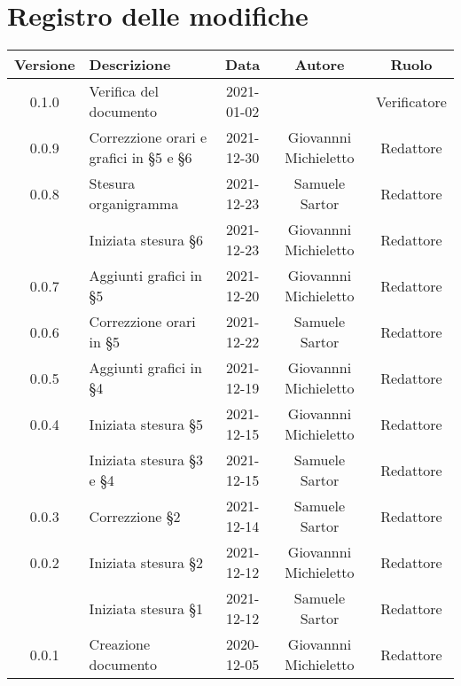 \section*{Registro delle modifiche}

\begin{center}
	\begin{longtable}{|c|p{5cm}|c|c|c|}
	\hline
	\rowcolor{lighter-grayer}
	\textbf{Versione} & \textbf{Descrizione} & \textbf{Data} & \textbf{Autore} & \textbf{Ruolo} \\
	\hline
	\endfirsthead


	0.1.0 & Verifica del documento & 2021-01-02 & & Verificatore \\
	\hline 
	0.0.9 & Correzzione orari e grafici in §5 e §6 & 2021-12-30	& Giovannni Michieletto & Redattore \\
	0.0.8 & Stesura organigramma & 2021-12-23 & Samuele Sartor & Redattore \\
		  & Iniziata stesura §6 & 2021-12-23 & Giovannni Michieletto & Redattore \\
	0.0.7 & Aggiunti grafici in §5 & 2021-12-20	& Giovannni Michieletto & Redattore \\
	0.0.6 & Correzzione orari in §5 & 2021-12-22 & Samuele Sartor & Redattore \\
	0.0.5 & Aggiunti grafici in §4 & 2021-12-19	&Giovannni Michieletto & Redattore \\
	0.0.4 & Iniziata stesura §5 & 2021-12-15 & Giovannni Michieletto & Redattore \\
		  & Iniziata stesura §3 e §4 & 2021-12-15 & Samuele Sartor & Redattore \\
	0.0.3 & Correzzione §2 & 2021-12-14 & Samuele Sartor & Redattore \\
	0.0.2 & Iniziata stesura §2 & 2021-12-12 & Giovannni Michieletto & Redattore \\
		  & Iniziata stesura §1  & 2021-12-12 & Samuele Sartor & Redattore \\
	0.0.1 & Creazione documento & 2020-12-05 & Giovannni Michieletto & Redattore \\
	\hline

	\end{longtable}
\end{center}